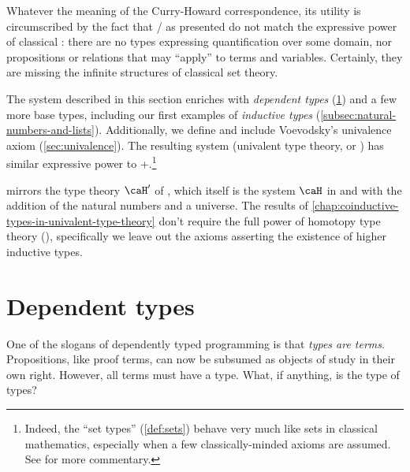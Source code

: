 \documentclass[12pt,twoside]{reedthesis}
\begin{document}
Whatever the meaning of the Curry-Howard correspondence, its utility is
circumscribed by the fact that \IPL{}/\TLC{} as
presented do not match the expressive power of classical \FOL:
there are no types expressing quantification over some domain, nor propositions
or relations that may ``apply'' to terms and variables. Certainly, they are
missing the infinite structures of classical set theory.

The system described in this section enriches \TLC{} with
\textit{dependent types} (\cref{sec:dependent-types}) and a few more base types,
including our first examples of \textit{inductive types}
(\cref{subsec:natural-numbers-and-lists}). Additionally, we define and include
Voevodsky's univalence axiom (\cref{sec:univalence}). The
resulting system (univalent type theory, or \UTT{}) has similar
expressive power to \ZFC+\FOL.\footnote{Indeed, the
  ``set types'' (\cref{def:sets}) behave very much like sets in classical
  mathematics, especially when a few classically-minded axioms are assumed. See
  \cite{book} for more commentary.}

\UTT{} mirrors the type theory $\caH'$ of \cite{homotopy-limits}, which itself
is the system $\caH$ in \cite{inductive} and \cite{homotopy-initial} with the
addition of the natural numbers and a universe. The results of
\cref{chap:coinductive-types-in-univalent-type-theory} don't
require the full power of homotopy type theory (\HoTT), specifically we leave
out the axioms asserting the existence of higher inductive types.

\section{Dependent types}
\label{sec:dependent-types}

One of the slogans of dependently typed programming is that \textit{types are
terms}. Propositions, like proof terms, can now be subsumed as objects of study
in their own right. However, all terms must have a type. What, if anything, is
the type of types?
\end{document}
